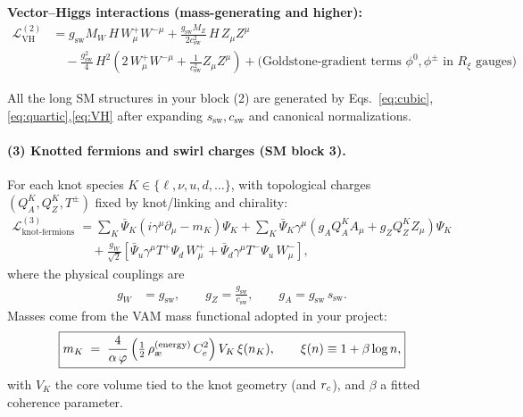 \documentclass[11pt]{article}
\begin{document}
    \noindent\textbf{Vector--Higgs interactions (mass-generating and higher):}
    \begin{align}
        \mathcal{L}^{(2)}_{\text{VH}}
        &= g_\text{sw} M_W\, H\, W_\mu^+ W^{-\mu}
        + \frac{g_\text{sw} M_Z}{2 c_\text{sw}^2}\, H\, Z_\mu Z^\mu
        \nonumber\\
        &\quad
        - \frac{g_\text{sw}^2}{4}\, H^2 \left(2\,W_\mu^+ W^{-\mu} + \frac{1}{c_\text{sw}^2} Z_\mu Z^\mu\right)
        + \text{(Goldstone-gradient terms $\phi^0,\phi^\pm$ in $R_\xi$ gauges)}
        \label{eq:VH}
    \end{align}

    All the long SM structures in your block (2) are generated by Eqs.~\eqref{eq:cubic},\eqref{eq:quartic},\eqref{eq:VH} after expanding $s_\text{sw},c_\text{sw}$ and canonical normalizations.

    \paragraph{(3) Knotted fermions and swirl charges (SM block 3).}
    For each knot species \(K\in\{\ell, \nu, u, d, \dots\}\), with topological charges \((Q_A^K,Q_Z^K,T^\pm)\) fixed by knot/linking and chirality:
    \begin{align}
        \mathcal{L}^{(3)}_{\text{knot-fermions}}
        &= \sum_K \bar{\Psi}_K \left(i\gamma^\mu \partial_\mu - m_K\right)\Psi_K
        + \sum_K \bar{\Psi}_K \gamma^\mu \left( g_A Q_A^K A_\mu + g_Z Q_Z^K Z_\mu \right)\Psi_K
        \nonumber\\
        &\quad + \frac{g_W}{\sqrt{2}} \left[ \bar{\Psi}_u \gamma^\mu T^+ \Psi_d\, W_\mu^+ + \bar{\Psi}_d \gamma^\mu T^- \Psi_u\, W_\mu^- \right],
    \end{align}
    where the physical couplings are
    \begin{align}
        g_W &= g_\text{sw},\qquad
        g_Z = \frac{g_\text{sw}}{c_\text{sw}},\qquad
        g_A = g_\text{sw}\, s_\text{sw}.
    \end{align}
    Masses come from the VAM mass functional adopted in your project:
    \begin{align}
        \boxed{
            m_K \;=\; \frac{4}{\alphaEM\,\phiG}\,
            \Big(\tfrac{1}{2}\,\rhoe\,\Ce^2\Big)\,
            V_K \,\xi(n_K),
            \qquad \xi(n)\equiv 1+\beta\log n,
        }
    \end{align}
    with \(V_K\) the core volume tied to the knot geometry (and \(r_c\)), and \(\beta\) a fitted coherence parameter.
\end{document}
